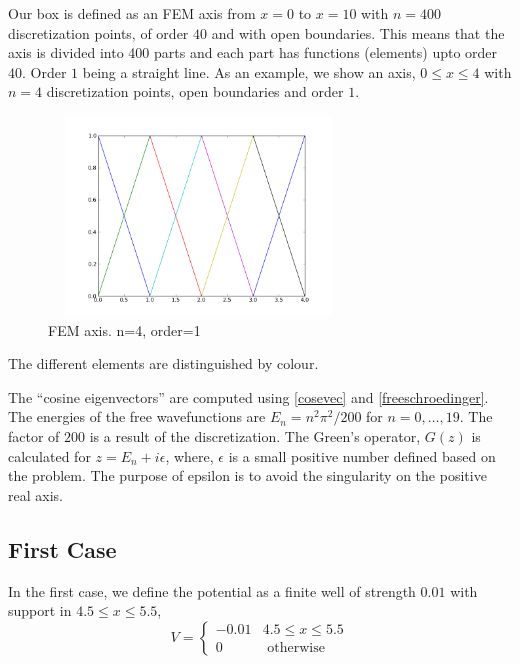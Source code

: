 \documentclass[a4paper,10pt]{report}
\begin{document}
Our box is defined as an FEM axis from $x=0$ to $x=10$ with $n=400$ discretization points, 
of order $40$ and with open boundaries. This means that the axis is divided into 400 
parts and each part has functions (elements) upto order $40$. Order $1$ being a straight
line. As an example, we show an axis, $0\leq x\leq 4$ with $n=4$ discretization points, open
boundaries and order $1$.

\begin{figure}[hm]
\centering
\includegraphics[width=225pt, height=150pt]{femexample1.png}
\caption[\textwidth]{FEM axis. n=4, order=1}
\end{figure}
The different elements are distinguished by colour.

The ``cosine eigenvectors'' are computed using \eqref{cosevec} and \eqref{freeschroedinger}.
The energies of the free wavefunctions are $E_n = n^2\pi^2/200$ for $n=0,\ldots,19$. The factor
of $200$ is a result of the discretization. The Green's operator, $G(z)$ is calculated for $z=E_n+i\epsilon$,
where, $\epsilon$ is a small positive number defined based on the problem. The purpose of epsilon is to avoid 
the singularity on the positive real axis.

\subsection{First Case}
In the first case, we define the potential as a finite well of strength $0.01$ with support in $4.5 \leq x \leq 5.5$,
\begin{equation}\label{potentialdef1}
V = \begin{cases}
-0.01 &\mbox{} 4.5\leq x\leq 5.5\\
0 &\mbox{ otherwise}
\end{cases} 
\end{equation}
\end{document}
